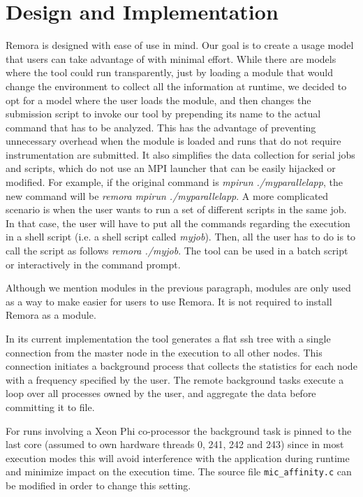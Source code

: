 \documentclass[10pt,a4paper]{report}
\begin{document}
\chapter{Design and Implementation}
Remora is designed with ease of use in mind. Our goal is to create a usage model that users can take advantage of with minimal effort. While there are models where the tool could run transparently, just by loading a module that would change the environment to collect all the information at runtime, we decided to opt for a model where the user loads the module, and then changes the submission script to invoke our tool by prepending its name to the actual command that has to be analyzed. This has the advantage of preventing unnecessary overhead when the module is loaded and runs that do not require instrumentation are submitted. It also simplifies the data collection for serial jobs and scripts, which do not use an MPI launcher that can be easily hijacked or modified. For example, if the original command is \textit{mpirun ./myparallelapp}, the new command will be \textit{remora mpirun ./myparallelapp}. A more complicated scenario is when the user wants to run a set of different scripts in the same job. In that case, the user will have to put all the commands regarding the execution in a shell script (i.e. a shell script called \textit{myjob}). Then, all the user has to do is to call the script as follows \textit{remora ./myjob}. The tool can be used in a batch script or interactively in the command prompt.

Although we mention modules in the previous paragraph, modules are only used as a way to make easier for users to use Remora. It is not required to install Remora as a module.

In its current implementation the tool generates a flat ssh tree with a single connection from the master node in the execution to all other nodes. This connection initiates a background process that collects the statistics for each node with a frequency specified by the user. The remote background tasks execute a loop over all processes owned by the user, and aggregate the data before committing it to file.

For runs involving a Xeon Phi co-processor the background task is pinned to the last core (assumed to own hardware threads 0, 241, 242 and 243) since in most execution modes this will avoid interference with the application during runtime and minimize impact on the execution time. The source file \texttt{mic\_affinity.c} can be modified in order to change this setting.
\end{document}

